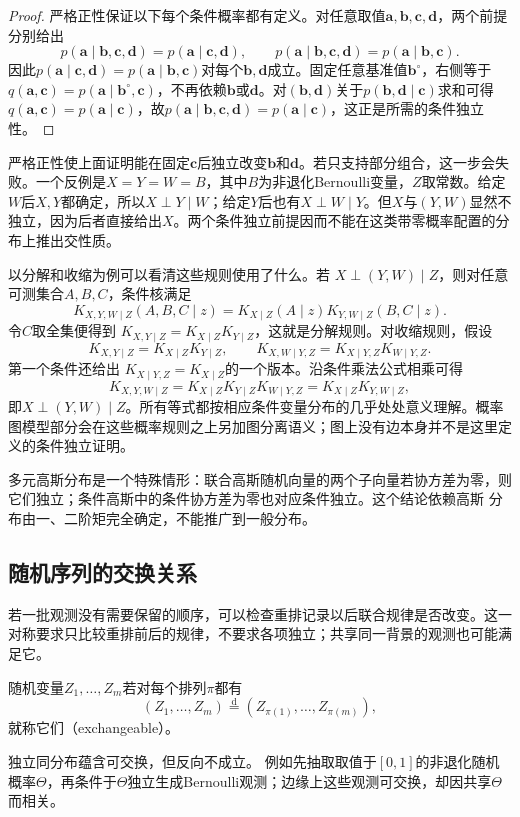 \begin{proof}
严格正性保证以下每个条件概率都有定义。对任意取值$\bm{a},\bm{b},\bm{c},\bm{d}$，两个前提分别给出
\[
  p(\bm{a}\mid\bm{b},\bm{c},\bm{d})
  =p(\bm{a}\mid\bm{c},\bm{d}),
  \qquad
  p(\bm{a}\mid\bm{b},\bm{c},\bm{d})
  =p(\bm{a}\mid\bm{b},\bm{c}).
\]
因此$p(\bm{a}\mid\bm{c},\bm{d})=p(\bm{a}\mid\bm{b},\bm{c})$对每个$\bm{b},\bm{d}$成立。固定任意基准值$\bm{b}^{\circ}$，右侧等于$q(\bm{a},\bm{c})=p(\bm{a}\mid\bm{b}^{\circ},\bm{c})$，不再依赖$\bm{b}$或$\bm{d}$。对$(\bm{b},\bm{d})$关于$p(\bm{b},\bm{d}\mid\bm{c})$求和可得$q(\bm{a},\bm{c})=p(\bm{a}\mid\bm{c})$，故$p(\bm{a}\mid\bm{b},\bm{c},\bm{d})=p(\bm{a}\mid\bm{c})$，这正是所需的条件独立性。
\end{proof}
严格正性使上面证明能在固定\(\bm c\)后独立改变\(\bm b\)和\(\bm d\)。若只支持部分组合，这一步会失败。一个反例是\(X=Y=W=B\)，其中\(B\)为非退化Bernoulli变量，\(Z\)取常数。给定\(W\)后\(X,Y\)都确定，所以\(X\perp Y\mid W\)；给定\(Y\)后也有\(X\perp W\mid Y\)。但\(X\)与\((Y,W)\)显然不独立，因为后者直接给出\(X\)。两个条件独立前提因而不能在这类带零概率配置的分布上推出交性质。

以分解和收缩为例可以看清这些规则使用了什么。若
\(X\perp(Y,W)\mid Z\)，则对任意可测集合\(A,B,C\)，条件核满足
\[
  K_{X,Y,W\mid Z}(A,B,C\mid z)
  =K_{X\mid Z}(A\mid z)K_{Y,W\mid Z}(B,C\mid z).
\]
令\(C\)取全集便得到
\(K_{X,Y\mid Z}=K_{X\mid Z}K_{Y\mid Z}\)，这就是分解规则。对收缩规则，假设
\[
  K_{X,Y\mid Z}=K_{X\mid Z}K_{Y\mid Z},
  \qquad
  K_{X,W\mid Y,Z}=K_{X\mid Y,Z}K_{W\mid Y,Z}.
\]
第一个条件还给出
\(K_{X\mid Y,Z}=K_{X\mid Z}\)的一个版本。沿条件乘法公式相乘可得
\[
  K_{X,Y,W\mid Z}
  =K_{X\mid Z}K_{Y\mid Z}K_{W\mid Y,Z}
  =K_{X\mid Z}K_{Y,W\mid Z},
\]
即\(X\perp(Y,W)\mid Z\)。所有等式都按相应条件变量分布的几乎处处意义理解。概率图模型部分会在这些概率规则之上另加图分离语义；图上没有边本身并不是这里定义的条件独立证明。

多元高斯分布是一个特殊情形：联合高斯随机向量的两个子向量若协方差为零，则它们独立；条件高斯中的条件协方差为零也对应条件独立。这个结论依赖高斯
分布由一、二阶矩完全确定，不能推广到一般分布。

\subsection{随机序列的交换关系}

若一批观测没有需要保留的顺序，可以检查重排记录以后联合规律是否改变。这一对称要求只比较重排前后的规律，不要求各项独立；共享同一背景的观测也可能满足它。
\label{sec:rv-exchangeability}
\begin{definition}[可交换随机变量]
  \label{def:probability-exchangeability}
随机变量\(Z_1,\ldots,Z_m\)若对每个排列\(\pi\)都有
\[ (Z_1,\ldots,Z_m)
  \overset{\mathrm{d}}{=}(Z_{\pi(1)},\ldots,Z_{\pi(m)}), \]
就称它们（exchangeable）。
\end{definition}
独立同分布蕴含可交换，但反向不成立。
例如先抽取取值于\([0,1]\)的非退化随机概率\(\Theta\)，再条件于\(\Theta\)独立生成Bernoulli观测；边缘上这些观测可交换，却因共享\(\Theta\)而相关。


